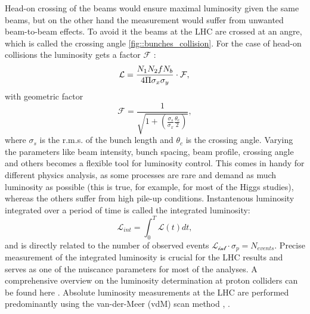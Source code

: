 	Head-on crossing of the beams would ensure maximal luminosity given the same beams, but on the other hand the measurement would suffer from unwanted beam-to-beam effects. To avoid it the beams at the LHC are crossed at an angre, which is called the crossing angle \ref{fig::bunches_collision}. 
	For the case of head-on collisions the luminosity gets a factor $\mathcal{F} $ \cite{Lumi}:
	\begin{equation}
	\mathcal{L} = \frac{N_1N_2fN_b}{4\Pi \sigma_x \sigma_y} \cdot \mathcal{F},\\
	\end{equation}
	with geometric factor
	\begin{equation}
	\nonumber
	\mathcal{F} = \frac{1}{\sqrt{ 1+\left(  \frac{\sigma_s}{\sigma_x}  \frac{\theta_c}{2} \right) }},
	\end{equation}
	where $\sigma_s$ is the r.m.s. of the bunch length and $\theta_c$ is the crossing angle. Varying the parameters like beam intensity, bunch spacing, beam profile, crossing angle and others becomes a flexible tool for luminosity control. This comes in handy for different physics analysis, as some processes are rare and demand as much luminosity as possible (this is true, for example, for most of the Higgs studies), whereas the others suffer from high pile-up conditions.
	Instantenous luminosity integrated over a period of time is called the integrated luminosity:
	\begin{equation}
	\mathcal{L}_{int} = \int_0^{T} \mathcal{L}(t) dt,
	\end{equation}
	and is directly related to the number of observed events $\mathcal{L_{int}} \cdot \sigma_p = N_{events}$. Precise measurement of the integrated luminosity is crucial for the LHC results and serves as one of the nuiscance parameters for most of the analyses. A comprehensive overview on the luminosity determination at proton colliders can be found here \cite{lumi_witold}. Absolute luminosity measurements at the LHC are performed predominantly using the van-der-Meer (vdM) scan method \cite{vdm1}, \cite{vdm2}. 
	
